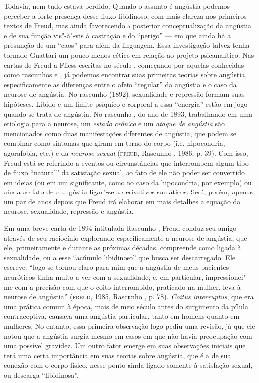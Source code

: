 Todavia, nem tudo estava perdido. Quando o assunto é angústia podemos
perceber a forte presença desse fluxo libidinoso, com mais clareza nos
primeiros textos de Freud, mas ainda favorecendo a posterior
conceptualização da angústia e de sua função vis"-à"-vis à castração e do
``perigo'' --- em que ainda há a presunção de um ``caos'' para além da
linguagem. Essa investigação talvez tenha tornado Guattari um pouco
menos cético em relação ao projeto psicanalítico. Nas cartas de Freud a
Fliess escritas no século , começando por aquelas conhecidas como
rascunhos  e , já podemos encontrar suas primeiras teorias sobre
angústia, especificamente as diferenças entre o afeto ``regular'' da
angústia e o caso da neurose de angústia. No rascunho  (1892),
sexualidade e repressão formam suas hipóteses. Libido e um limite
psíquico e corporal a essa ``energia'' estão em jogo quando se trata de
angústia. No rascunho , do ano de 1893, trabalhando em uma etiologia
para a neurose, um \emph{estado crônico} e um \emph{ataque de angústia}
são mencionados como duas manifestações diferentes de angústia, que
podem se combinar como sintomas que giram em torno do corpo (i.e.
hipocondria, agorafobia, etc.) e da \emph{neurose sexual} (\textsc{freud},
Rascunho , 1986, p. 39). Com isso, Freud está se referindo a
eventos ou circunstâncias que interrompem algum tipo de fluxo
``natural'' da satisfação sexual, ao fato de ele não poder ser
convertido em ideias (ou em um significante, como no caso da
hipocondria, por exemplo) ou ainda ao fato de a angústia ligar"-se a
derivativos somáticos. Será, porém, apenas um par de anos depois que
Freud irá elaborar em mais detalhes a equação da neurose, sexualidade,
repressão e angústia.

Em uma breve carta de 1894 intitulada Rascunho , Freud conduz seu amigo
através de seu raciocínio explorando especificamente a neurose de
angústia, que ele, primeiramente e durante as próximas décadas,
compreende como ligada à sexualidade, ou a esse ``acúmulo libidinoso''
que busca ser descarregado. Ele escreve: ``logo se tornou claro para mim
que a angústia de meus pacientes neuróticos tinha muito a ver com a
sexualidade; e, em particular, impressionei"-me com a precisão com que o
coito interrompido, praticado na mulher, leva à neurose de angústia''
(\textsc{freud}, 1985, Rascunho , p. 78). \emph{Coitus interruptus}, que
era uma prática comum à época, mais de meio século antes do surgimento
da pílula contraceptiva, causava uma angústia particular, tanto em
homens quanto em mulheres. No entanto, essa primeira observação logo
pediu uma revisão, já que ele notou que a angústia surgia mesmo em casos
em que não havia preocupação com uma possível gravidez. Um outro fator
emerge em suas observações iniciais que terá uma certa importância em
suas teorias sobre angústia, que é a de sua conexão com o corpo físico,
nesse ponto ainda ligado somente à satisfação sexual, ou descarga
``libidinosa''.

